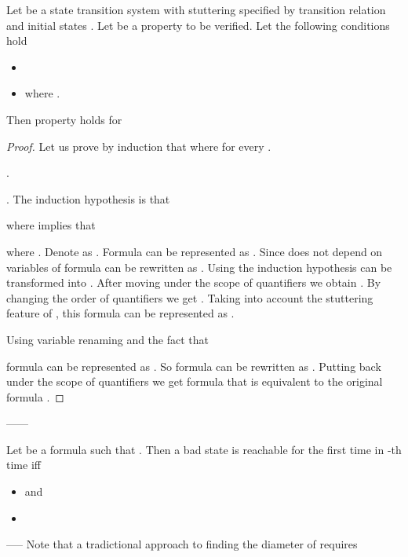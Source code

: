 \begin{proposition}
\label{prop:main_lort}
Let \Et be a state transition system with stuttering specified by
transition relation  and initial states . Let  be a property
to be verified.  Let the following conditions hold
\begin{itemize}
\item {} 
\item   where .
\end{itemize}
Then property  holds for  \et
\end{proposition}
\begin{proof}[\kern-10pt Proof] Let us prove by induction that 
 where  for every .

\vspace{5pt}
\noindent{}. 

\vspace{5pt}
\noindent{}. The induction hypothesis is that

where  implies that

where . Denote 
as \Fi. Formula \Fii can be represented
as . Since  does not depend on variables
of  formula \Fii can be rewritten as
.
Using the induction hypothesis \Fii can be transformed into
.
After moving  under the scope of quantifiers we obtain
. By
changing the order of quantifiers we get
.
Taking into account the stuttering feature of \Et, this formula can be
represented as .

Using variable renaming and the fact that  

formula 
can be represented as .
So formula \Fii can be rewritten as . Putting
 back under the scope of quantifiers we get formula
 that is equivalent
to the original formula \Fi.
\end{proof}
------
\begin{proposition}
\label{prop:bad_state}
Let  be a formula such that .
Then a bad state  is reachable for the first time in -th
time iff 
\begin{itemize}
\item  and 
\item {} 
\end{itemize}
\end{proposition}
-----
 Note that
a tradictional approach to finding the diameter of \Ks requires
